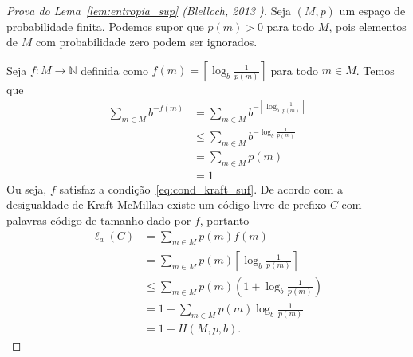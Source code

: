   \begin{proof}[Prova do Lema~\ref{lem:entropia_sup} (Blelloch, 2013 \cite{Ble})]
    Seja $(M,p)$ um espaço de probabilidade finita. Podemos supor que
    $p(m)>0$ para todo $M$, pois elementos de $M$ com probabilidade
    zero podem ser ignorados.

    Seja $f:M\to\mathbb{N}$ definida como $f(m) = \left \lceil{\log_b
      \frac{1}{p(m)} }\right \rceil$ para todo $m\in M$. Temos que
\begin{align*}
  \sum_{m \in M}^{} b^{-f(m)} &=
  \sum_{m \in M}^{} b^{-\left \lceil{\log_b \frac{1}{p(m)} }\right \rceil} \\
  &\leq \sum_{m \in M}^{} b^{-{\log_b \frac{1}{p(m)} }} \\
  &= \sum_{m \in M}^{} p(m) \\
  &= 1
\end{align*}
Ou seja, $f$ satisfaz a condição~\eqref{eq:cond_kraft_suf}. De acordo
com a desigualdade de Kraft-McMillan existe um código livre de prefixo
$C$ com palavras-código de tamanho dado por $f$, portanto
\begin{align*}
  \ell_a(C) &=
  \sum_{m \in M} p(m) f(m) \\
  &=  \sum_{m \in M} p(m) \left \lceil{\log_b \frac{1}{p(m)} }\right \rceil \\
&\leq \sum_{m \in M}^{}p(m) \left(1 + \log_b \frac{1}{p(m)}\right) \\
&= 1 +  \sum_{m \in M}^{}p(m) \log_b \frac{1}{p(m)} \\
&= 1 + H(M,p,b).
\end{align*}
\end{proof}





